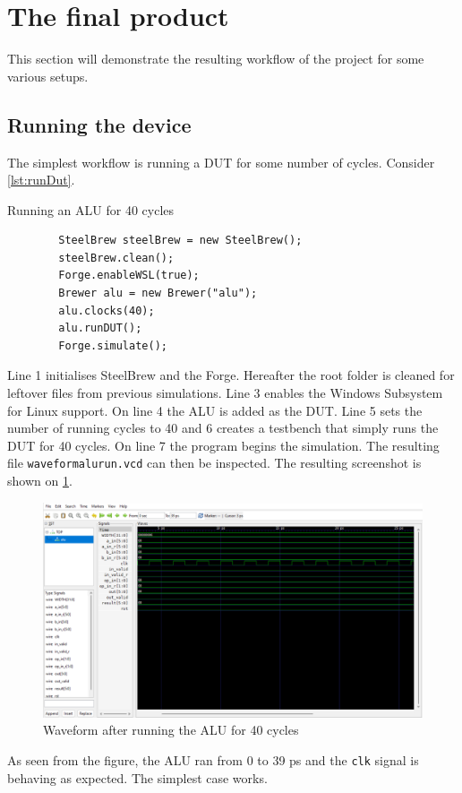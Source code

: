 \section{The final product}\label{sec:06}
This section will demonstrate the resulting workflow of the project for some various setups.
\subsection{Running the device}
The simplest workflow is running a DUT for some number of cycles. Consider \cref{lst:runDut}.
\begin{listing}
    \centering
    \caption{Running an ALU for 40 cycles}\label{lst:runDut}
    \begin{verbatim}
        SteelBrew steelBrew = new SteelBrew();
        steelBrew.clean();
        Forge.enableWSL(true);
        Brewer alu = new Brewer("alu");
        alu.clocks(40);
        alu.runDUT();
        Forge.simulate();
    \end{verbatim}
\end{listing}
Line 1 initialises SteelBrew and the Forge. Hereafter the root folder is cleaned for leftover files from previous simulations. Line 3 enables the Windows Subsystem for Linux support. On line 4 the ALU is added as the DUT. Line 5 sets the number of running cycles to 40 and 6 creates a testbench that simply runs the DUT for 40 cycles. On line 7 the program begins the simulation. The resulting file \texttt{waveformalurun.vcd} can then be inspected. The resulting screenshot is shown on \cref{fig:runDut}.
\begin{figure}
    \centering
    \caption{Waveform after running the ALU for 40 cycles}\label{fig:runDut}
    \includegraphics[width=.8\textwidth]{graphics/runDUT.png}
\end{figure}
As seen from the figure, the ALU ran from 0 to 39 ps and the \texttt{clk} signal is behaving as expected. The simplest case works.
